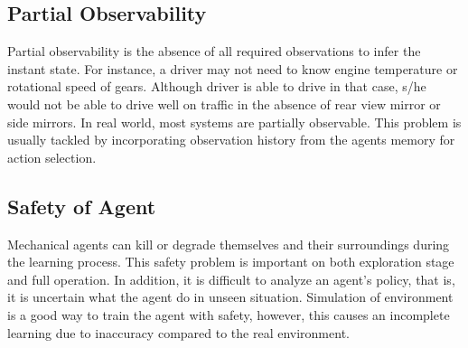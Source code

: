 \subsection{Partial Observability}

Partial observability is the absence of all required observations to infer the instant state. 
For instance, a driver may not need to know engine temperature or rotational speed of gears. 
Although driver is able to drive in that case, s/he would not be able to drive well on traffic in the absence of rear view mirror or side mirrors. 
In real world, most systems are partially observable. 
This problem is usually tackled by incorporating observation history from the agents memory for action selection. 

\subsection{Safety of Agent}

Mechanical agents can kill or degrade themselves and their surroundings during the learning process. 
This safety problem is important on both exploration stage and full operation. 
In addition, it is difficult to analyze an agent's policy, that is, it is uncertain what the agent do in unseen situation. 
Simulation of environment is a good way to train the agent with safety, however, this causes an incomplete learning due to inaccuracy compared to the real environment. 
